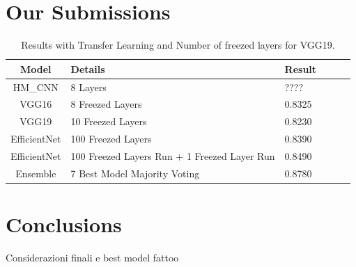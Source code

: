 \documentclass[10pt]{article}
\begin{document}
\section{Our Submissions}
\begin{table}[ht]
\centering
\begin{adjustbox}{width=240}
\small
\begin{tabular}{|c|l|l|l|l|l}

\hline \bf Model & \bf Details & \bf Result \\ \hline
HM_{CNN} & 8 Layers & ???? \\
VGG16   & 8 Freezed Layers & 0.8325 \\
VGG19   & 10 Freezed Layers & 0.8230 \\
EfficientNet   & 100 Freezed Layers & 0.8390 \\
EfficientNet   & 100 Freezed Layers  Run + 1 Freezed Layer Run & 0.8490 \\
Ensemble & 7 Best Model Majority Voting & 0.8780 \\
\hline
\end{tabular}
\end{adjustbox}
\caption{Results with Transfer Learning and Number of freezed layers for VGG19.}
\end{table}
\section{Conclusions}
Considerazioni finali e best model fattoo

\end{document}
